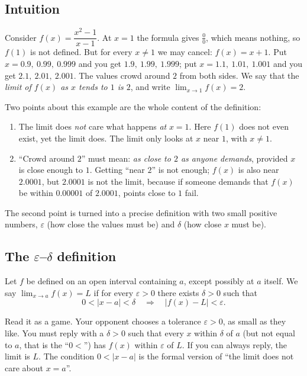 \subsection{Intuition}
Consider $f(x)=\dfrac{x^2-1}{x-1}$. At $x=1$ the formula gives $\frac00$, which means nothing, so $f(1)$ is not defined. But for every $x\ne1$ we may cancel: $f(x)=x+1$. Put $x=0.9,\ 0.99,\ 0.999$ and you get $1.9,\ 1.99,\ 1.999$; put $x=1.1,\ 1.01,\ 1.001$ and you get $2.1,\ 2.01,\ 2.001$. The values crowd around $2$ from both sides. We say that the \emph{limit of $f(x)$ as $x$ tends to $1$ is $2$}, and write $\lim_{x\to1}f(x)=2$.

Two points about this example are the whole content of the definition:
\begin{enumerate}
\item The limit does \emph{not} care what happens \emph{at} $x=1$. Here $f(1)$ does not even exist, yet the limit does. The limit only looks at $x$ near $1$, with $x\ne1$.
\item ``Crowd around $2$'' must mean: \emph{as close to $2$ as anyone demands}, provided $x$ is close enough to $1$. Getting ``near $2$'' is not enough; $f(x)$ is also near $2.0001$, but $2.0001$ is not the limit, because if someone demands that $f(x)$ be within $0.00001$ of $2.0001$, points close to $1$ fail.
\end{enumerate}
The second point is turned into a precise definition with two small positive numbers, $\varepsilon$ (how close the values must be) and $\delta$ (how close $x$ must be).

\subsection{The \texorpdfstring{$\varepsilon$--$\delta$}{epsilon-delta} definition}
\begin{definition}[Limit]
Let $f$ be defined on an open interval containing $a$, except possibly at $a$ itself. We say $\lim_{x\to a}f(x)=L$ if for every $\varepsilon>0$ there exists $\delta>0$ such that
\[
0<|x-a|<\delta\quad\Longrightarrow\quad |f(x)-L|<\varepsilon .
\]
\end{definition}
Read it as a game. Your opponent chooses a tolerance $\varepsilon>0$, as small as they like. You must reply with a $\delta>0$ such that every $x$ within $\delta$ of $a$ (but not equal to $a$, that is the ``$0<$'') has $f(x)$ within $\varepsilon$ of $L$. If you can always reply, the limit is $L$. The condition $0<|x-a|$ is the formal version of ``the limit does not care about $x=a$''.

